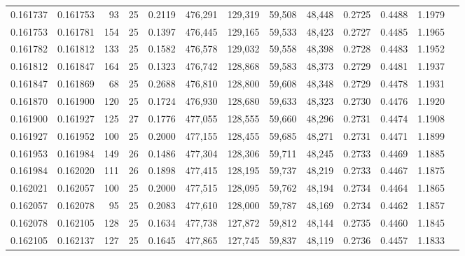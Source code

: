 \begin{tabular}{rrrrrrrrrrrrr}
0.161737 & 0.161753 &  93 &  25 &                                     0.2119 & 476,291 & 129,319 &  59,508 &  48,448 & 0.2725 & 0.4488 & 1.1979 \\
0.161753 & 0.161781 & 154 &  25 &                                     0.1397 & 476,445 & 129,165 &  59,533 &  48,423 & 0.2727 & 0.4485 & 1.1965 \\
0.161782 & 0.161812 & 133 &  25 &                                     0.1582 & 476,578 & 129,032 &  59,558 &  48,398 & 0.2728 & 0.4483 & 1.1952 \\
0.161812 & 0.161847 & 164 &  25 &                                     0.1323 & 476,742 & 128,868 &  59,583 &  48,373 & 0.2729 & 0.4481 & 1.1937 \\
0.161847 & 0.161869 &  68 &  25 &                                     0.2688 & 476,810 & 128,800 &  59,608 &  48,348 & 0.2729 & 0.4478 & 1.1931 \\
0.161870 & 0.161900 & 120 &  25 &                                     0.1724 & 476,930 & 128,680 &  59,633 &  48,323 & 0.2730 & 0.4476 & 1.1920 \\
0.161900 & 0.161927 & 125 &  27 &                                     0.1776 & 477,055 & 128,555 &  59,660 &  48,296 & 0.2731 & 0.4474 & 1.1908 \\
0.161927 & 0.161952 & 100 &  25 &                                     0.2000 & 477,155 & 128,455 &  59,685 &  48,271 & 0.2731 & 0.4471 & 1.1899 \\
0.161953 & 0.161984 & 149 &  26 &                                     0.1486 & 477,304 & 128,306 &  59,711 &  48,245 & 0.2733 & 0.4469 & 1.1885 \\
0.161984 & 0.162020 & 111 &  26 &                                     0.1898 & 477,415 & 128,195 &  59,737 &  48,219 & 0.2733 & 0.4467 & 1.1875 \\
0.162021 & 0.162057 & 100 &  25 &                                     0.2000 & 477,515 & 128,095 &  59,762 &  48,194 & 0.2734 & 0.4464 & 1.1865 \\
0.162057 & 0.162078 &  95 &  25 &                                     0.2083 & 477,610 & 128,000 &  59,787 &  48,169 & 0.2734 & 0.4462 & 1.1857 \\
0.162078 & 0.162105 & 128 &  25 &                                     0.1634 & 477,738 & 127,872 &  59,812 &  48,144 & 0.2735 & 0.4460 & 1.1845 \\
0.162105 & 0.162137 & 127 &  25 &                                     0.1645 & 477,865 & 127,745 &  59,837 &  48,119 & 0.2736 & 0.4457 & 1.1833 \\

\end{tabular}

